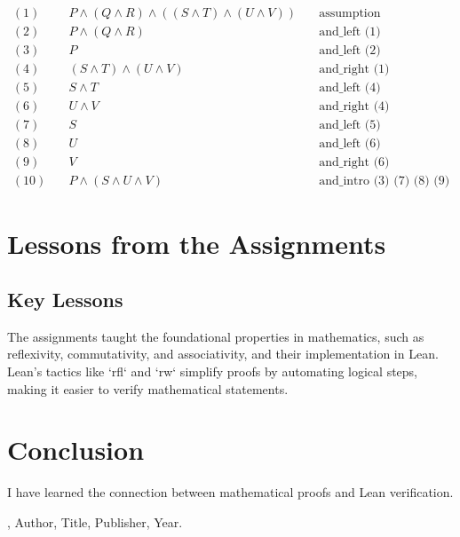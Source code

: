 \documentclass{article}
\theoremstyle{theorem}
\theoremstyle{definition}
\theoremstyle{remark}
\begin{document}
\begin{align*}
(1) &\quad P \land (Q \land R) \land ((S \land T) \land (U \land V)) \quad & \text{assumption} \\
(2) &\quad P \land (Q \land R) \quad & \text{and\_left (1)} \\
(3) &\quad P \quad & \text{and\_left (2)} \\
(4) &\quad (S \land T) \land (U \land V) \quad & \text{and\_right (1)} \\
(5) &\quad S \land T \quad & \text{and\_left (4)} \\
(6) &\quad U \land V \quad & \text{and\_right (4)} \\
(7) &\quad S \quad & \text{and\_left (5)} \\
(8) &\quad U \quad & \text{and\_left (6)} \\
(9) &\quad V \quad & \text{and\_right (6)} \\
(10) &\quad P \land (S \land U \land V) \quad & \text{and\_intro (3) (7) (8) (9)}
\end{align*}


\section{Lessons from the Assignments}

\subsection{Key Lessons}

The assignments taught the foundational properties in mathematics, such as reflexivity, commutativity, and associativity, and their implementation in Lean. Lean's tactics like `rfl` and `rw` simplify proofs by automating logical steps, making it easier to verify mathematical statements. 

\section{Conclusion}\label{conclusion}

I have learned the connection between mathematical proofs and Lean verification. 

\begin{thebibliography}{99}
\bibitem[BLA], Author, Title, Publisher, Year.
\end{thebibliography}
\end{document}
